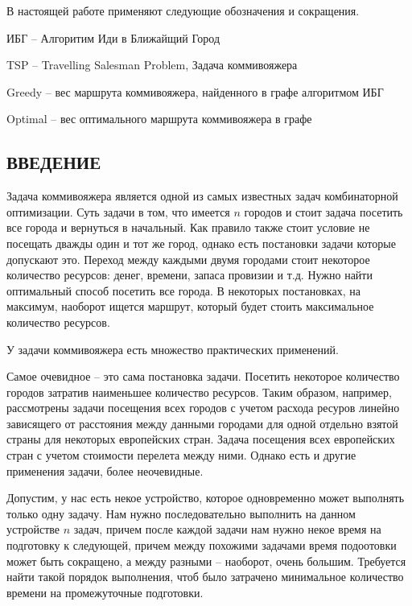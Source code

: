 \documentclass[a4paper, 14pt]{extarticle}
\numberwithin{equation}{section}
\begin{document}
В настоящей работе применяют следующие обозначения и сокращения.

ИБГ -- Алгоритим Иди в Ближайщий Город

TSP -- Travelling Salesman Problem, Задача коммивояжера

Greedy -- вес маршрута коммивояжера, найденного в графе алгоритмом ИБГ

Optimal -- вес оптимального маршрута коммивояжера в графе



\newpage

\begin{center}
\chapter{\textbf{ВВЕДЕНИЕ}}
\end{center}


Задача коммивояжера является одной из самых известных задач комбинаторной оптимизации. Суть задачи в том, что имеется $n$ городов и стоит задача посетить все города и вернуться в начальный. Как правило также стоит условие не посещать дважды один и тот же город, однако есть постановки задачи которые допускают это. Переход между каждыми двумя городами стоит некоторое количество ресурсов: денег, времени, запаса провизии и т.д. Нужно найти оптимальный способ посетить все города. В некоторых постановках, на максимум, наоборот ищется маршрут, который будет стоить максимальное количество ресурсов. 


У задачи коммивояжера есть множество практических применений. 

Самое очевидное -- это сама постановка задачи. Посетить некоторое количество городов затратив наименьшее количество ресурсов. Таким образом, например, рассмотрены задачи посещения всех городов с учетом расхода ресуров линейно зависящего от расстояния между данными городами для одной отдельно взятой страны для некоторых европейских стран. Задача посещения всех европейских стран с учетом стоимости перелета между ними. Однако есть и другие применения задачи, более неочевидные.

Допустим, у нас есть некое устройство, которое одновременно может выполнять только одну задачу.  Нам нужно последовательно выполнить на данном устройстве $n$ задач, причем после каждой задачи нам нужно некое время на подготовку к следующей, причем между похожими задачами время подоотовки может быть сокращено, а между разными -- наоборот, очень большим. Требуется найти такой порядок выполнения, чтоб было затрачено минимальное количество времени на промежуточные подготовки.
\end{document}
